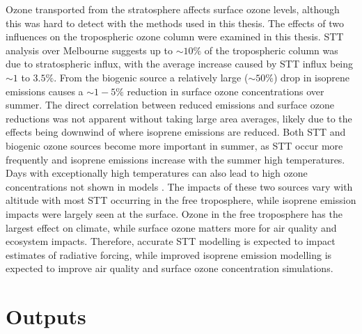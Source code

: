 {  %
  
  
  Ozone transported from the stratosphere affects surface ozone levels, although this was hard to detect with the methods used in this thesis.
  The effects of two influences on the tropospheric ozone column were examined in this thesis.
  STT analysis over Melbourne suggests up to $\sim 10\%$ of the tropospheric column was due to stratospheric influx, with the average increase caused by STT influx being $\sim 1$ to $3.5\%$.
  From the biogenic source a relatively large ($\sim{50}\%$) drop in isoprene emissions causes a $\sim{1-5}\%$ reduction in surface ozone concentrations over summer.
  The direct correlation between reduced emissions and surface ozone reductions was not apparent without taking large area averages, likely due to the effects being downwind of where isoprene emissions are reduced.
  Both STT and biogenic ozone sources become more important in summer, as STT occur more frequently and isoprene emissions increase with the summer high temperatures.
  Days with exceptionally high temperatures can also lead to high ozone concentrations not shown in models \parencite[e.g.][]{PatonWalsh2018}.
  The impacts of these two sources vary with altitude with most STT occurring in the free troposphere, while isoprene emission impacts were largely seen at the surface.
  Ozone in the free troposphere has the largest effect on climate, while surface ozone matters more for air quality and ecosystem impacts.
  Therefore, accurate STT modelling is expected to impact estimates of radiative forcing, while improved isoprene emission modelling is expected to improve air quality and surface ozone concentration simulations.
  

  
  
\section{Outputs}
  \label{Conclusions:outputs}
  
}
